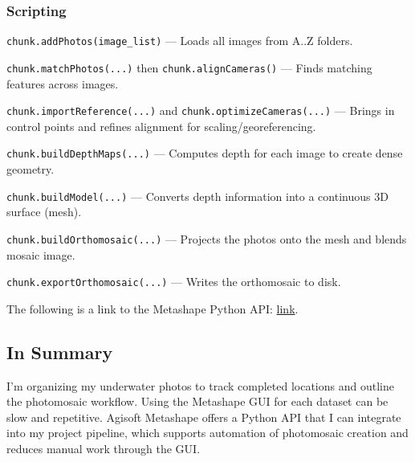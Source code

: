 \documentclass[a4paper,12pt]{article}
\begin{document}
\subsubsection{Scripting}


\begin{tcolorbox}[title=Add Photos]
\texttt{chunk.addPhotos(image\_list)} --- Loads all images from A..Z folders.
\end{tcolorbox}

\begin{tcolorbox}[title=Photo Alignment]
\texttt{chunk.matchPhotos(...)} then \texttt{chunk.alignCameras()} --- Finds matching features across images.
\end{tcolorbox}

\begin{tcolorbox}[title=GCP Import \& Optimization (optional)]
\texttt{chunk.importReference(...)} and \texttt{chunk.optimizeCameras(...)} --- Brings in control points and refines alignment for scaling/georeferencing.
\end{tcolorbox}

\begin{tcolorbox}[title=Dense Cloud Generation \& Filtering]
\texttt{chunk.buildDepthMaps(...)} --- Computes depth for each image to create dense geometry.
\end{tcolorbox}

\begin{tcolorbox}[title=Mesh Reconstruction]
\texttt{chunk.buildModel(...)} --- Converts depth information into a continuous 3D surface (mesh).
\end{tcolorbox}

\begin{tcolorbox}[title=Orthomosaic Generation]
\texttt{chunk.buildOrthomosaic(...)} --- Projects the photos onto the mesh and blends mosaic image.
\end{tcolorbox}

\begin{tcolorbox}[title=Export as GeoTIFF/OBJ]
\texttt{chunk.exportOrthomosaic(...)} --- Writes the orthomosaic to disk.
\end{tcolorbox}

The following is a link to the Metashape Python API:
\href{https://www.agisoft.com/pdf/metashape_python_api_2_2_0.pdf}{link}.

\subsection{In Summary}
I’m organizing my underwater photos to track completed locations and outline the photomosaic workflow. Using the Metashape GUI for each dataset can be slow and repetitive. Agisoft Metashape offers a Python API that I can integrate into my project pipeline, which supports automation of photomosaic creation and reduces manual work through the GUI.
\end{document}
